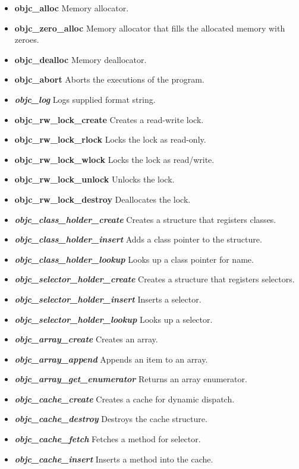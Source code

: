 \begin{itemize}
  \item{\bf{objc\_alloc}} Memory allocator.
  \item{\bf{objc\_zero\_alloc}} Memory allocator that fills the allocated memory with zeroes.
  \item{\bf{objc\_dealloc}} Memory deallocator.
  \item{\bf{objc\_abort}} Aborts the executions of the program.
  \item{\bf{\emph{objc\_log}}} Logs supplied format string.
  \item{\bf{objc\_rw\_lock\_create}} Creates a read-write lock.
  \item{\bf{objc\_rw\_lock\_rlock}} Locks the lock as read-only.
  \item{\bf{objc\_rw\_lock\_wlock}} Locks the lock as read/write.
  \item{\bf{objc\_rw\_lock\_unlock}} Unlocks the lock.
  \item{\bf{objc\_rw\_lock\_destroy}} Deallocates the lock.
  \item{\bf{\emph{objc\_class\_holder\_create}}} Creates a structure that registers classes.
  \item{\bf{\emph{objc\_class\_holder\_insert}}} Adds a class pointer to the structure.
  \item{\bf{\emph{objc\_class\_holder\_lookup}}} Looks up a class pointer for name.
  \item{\bf{\emph{objc\_selector\_holder\_create}}} Creates a structure that registers selectors.
  \item{\bf{\emph{objc\_selector\_holder\_insert}}} Inserts a selector.
  \item{\bf{\emph{objc\_selector\_holder\_lookup}}} Looks up a selector.
  \item{\bf{\emph{objc\_array\_create}}} Creates an array.
  \item{\bf{\emph{objc\_array\_append}}} Appends an item to an array.
  \item{\bf{\emph{objc\_array\_get\_enumerator}}} Returns an array enumerator.
  \item{\bf{\emph{objc\_cache\_create}}} Creates a cache for dynamic dispatch.
  \item{\bf{\emph{objc\_cache\_destroy}}} Destroys the cache structure.
  \item{\bf{\emph{objc\_cache\_fetch}}} Fetches a method for selector.
  \item{\bf{\emph{objc\_cache\_insert}}} Inserts a method into the cache.
\end{itemize}

